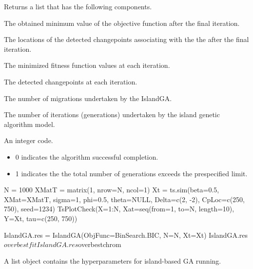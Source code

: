\documentclass[a4paper]{book}
\begin{document}
\begin{Value}
Returns a list that has the following components.
\begin{ldescription}
\item[\code{overbestfit}] The obtained minimum value of the objective function after
the final iteration.
\item[\code{overbestchrom}] The locations of the detected changepoints associating
with the  the after the final iteration.
\item[\code{bestfit}] The minimized fitness function values at each iteration.
\item[\code{bestchrom}] The detected changepoints at each iteration.
\item[\code{countMig}] The number of migrations undertaken by the IslandGA.
\item[\code{count}] The number of iterations (generations) undertaken by the island
genetic algorithm model.
\item[\code{convg}] An integer code.
\begin{itemize}

\item{} 0 indicates the algorithm successful completion.
\item{} 1 indicates the the total number of generations exceeds the
prespecified  limit.

\end{itemize}


\end{ldescription}
\end{Value}
%
\begin{Examples}
\begin{ExampleCode}
N = 1000
XMatT = matrix(1, nrow=N, ncol=1)
Xt = ts.sim(beta=0.5, XMat=XMatT, sigma=1, phi=0.5, theta=NULL,
            Delta=c(2, -2), CpLoc=c(250, 750), seed=1234)
TsPlotCheck(X=1:N, Xat=seq(from=1, to=N, length=10), Y=Xt, tau=c(250, 750))

IslandGA.res = IslandGA(ObjFunc=BinSearch.BIC, N=N, Xt=Xt)
IslandGA.res$overbestfit
IslandGA.res$overbestchrom
\end{ExampleCode}
\end{Examples}
%
\begin{Description}
A list object contains the hyperparameters for island-based GA running.
\end{Description}
%
\end{document}
